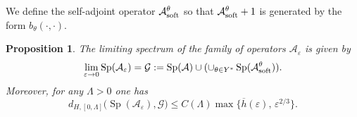 \documentclass[11pt]{article}
\newcommand\e {\varepsilon}
\newcommand\soft{{\rm soft}}
\def\AA{\mathcal{A}}
\DeclareMathOperator{\Sp}{Sp}
\newtheorem{proposition}[theorem]{Proposition}
\theoremstyle{remark}
\begin{document}
We define the self-adjoint operator $\AA_\soft^\theta$ so that     $\AA_\soft^\theta+1$ is generated by the  form       $b_\theta(\cdot,\cdot)$.  



\begin{proposition}\label{th7.11}
	The limiting spectrum of the family of operators $\AA_\e$ is given by
	\begin{equation*}%
		\lim_{\e\to 0} \Sp (\AA_\e) = \mathcal G : = \Sp(\AA) \cup ( \cup_{\theta\in Y^*} \Sp(\AA_\soft^\theta) ).
	\end{equation*}
	Moreover, for any $\Lambda >0$ one has
	\begin{equation*}%
		d_{H, [0, \Lambda]}\Big( \Sp (\AA_\e), \mathcal G \Big) \leq C(\Lambda) \max\{ \overline{h}(\e), \,\e^{2/3}\}.
	\end{equation*}

\end{proposition}
\end{document}
